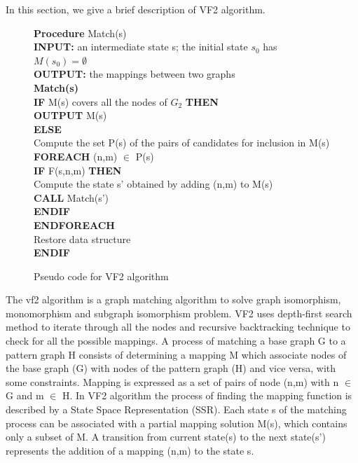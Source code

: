 In this section, we give a brief description of VF2 algorithm.\\

\begin{figure}

\begin{algorithm}[H]
\begin{algorithmic}
 \LState  \textbf{Procedure} Match(s)\\
\textbf{INPUT:}  an intermediate state s; the initial state $s_0$ has $M(s_0)=\emptyset$\\
\textbf{OUTPUT:} the mappings between two graphs\\
\textbf{Match(s)}\\
 \textbf{IF} M(s) covers all the nodes of $G_2$ \textbf{THEN}\\
\quad \textbf{OUTPUT} M(s)\\
\textbf{ELSE}\\
 \quad    Compute the set P(s) of the pairs of candidates for inclusion in M(s)\\
\quad\textbf{FOREACH} (n,m) $\in$ P(s)\\
\quad\quad\textbf{IF} F(s,n,m) \textbf{THEN}\\
\quad\quad\quad    Compute the state s' obtained by adding (n,m) to M(s)\\
\quad\quad\quad\textbf{CALL} Match(s')\\
\quad\quad\textbf{ENDIF}\\
\quad\textbf{ENDFOREACH}\\
\quad Restore data structure\\
\textbf{ENDIF}\\

\end{algorithmic}
\end{algorithm}
\caption{Pseudo code for VF2 algorithm\cite{cordella2001improved}}
\label{fig:VF2}
\end{figure}


The vf2 algorithm is a graph matching algorithm to solve graph isomorphism, monomorphism and  subgraph isomorphism problem. VF2 uses depth-first search method to iterate through all the nodes and recursive backtracking technique to check for all the possible mappings. A process of matching 
a base graph G to a pattern graph H consists of determining a mapping M which associate nodes of the base graph (G) with nodes of the pattern graph (H) and vice versa, with some constraints.
Mapping is expressed as a set of pairs of node (n,m) with n $\in$ G and m $\in$ H. 
In VF2 algorithm the process of finding the mapping function is described by a  State Space Representation (SSR). Each state s of the matching process can be associated with a partial mapping solution M(s),
which contains only a subset of M. A transition from current state(s) to the next state(s') represents the addition of a mapping (n,m) to the state s.

